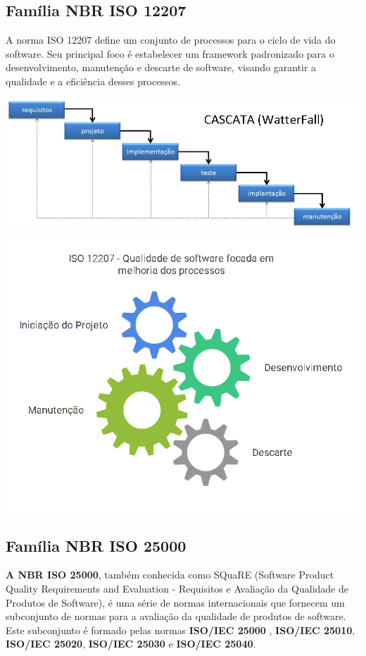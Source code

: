 \documentclass[
]{book}
\begin{document}
\subsection{Família NBR ISO 12207}\label{famuxedlia-nbr-iso-12207}

A norma ISO 12207 define um conjunto de processos para o ciclo de vida do software. Seu principal foco é estabelecer um framework padronizado para o desenvolvimento, manutenção e descarte de software, visando garantir a qualidade e a eficiência desses processos.

\includegraphics{images/modelos_processos_software/Cascata.jpg}

\includegraphics{images/qualidade-geral/ISO-12207-processos.png}

\subsection{Família NBR ISO 25000}\label{famuxedlia-nbr-iso-25000}

\textbf{A NBR ISO 25000}, também conhecida como SQuaRE (Software Product Quality Requirements and Evaluation - Requisitos e Avaliação da Qualidade de Produtos de Software), é uma série de normas internacionais que fornecem um subconjunto de normas para a avaliação da qualidade de produtos de software. Este subconjunto é formado pelas normas \textbf{ISO/IEC 25000} , \textbf{ISO/IEC 25010}, \textbf{ISO/IEC 25020}, \textbf{ISO/IEC 25030} e \textbf{ISO/IEC 25040}.
\end{document}
